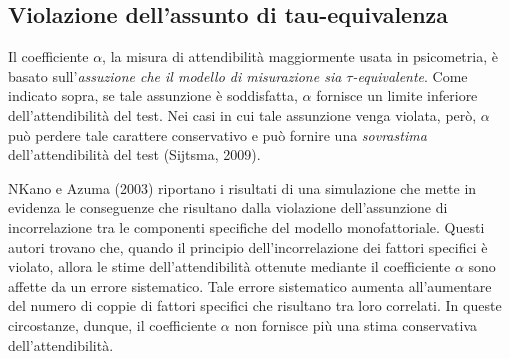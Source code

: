 \subsection{Violazione dell'assunto di tau-equivalenza}
\label{sec:violazione_tau}

Il coefficiente $\alpha$, la misura di attendibilità maggiormente
usata in psicometria, è basato sull'\textit{assuzione che il modello di
misurazione sia $\tau$-equivalente}.
Come indicato sopra, se tale assunzione è soddisfatta, $\alpha$ fornisce un limite inferiore dell'attendibilità del test.
Nei casi in cui tale assunzione venga violata, però,  $\alpha$ può perdere tale carattere conservativo e può fornire una \textit{sovrastima}  dell'attendibilità del test (Sijtsma, 2009).

NKano e Azuma (2003) riportano i risultati di una simulazione che mette in evidenza le conseguenze che risultano dalla violazione dell'assunzione di incorrelazione tra le componenti specifiche del modello monofattoriale.
% 
Questi autori trovano che, quando il principio dell'incorrelazione dei fattori specifici è violato, allora le stime dell'attendibilità ottenute mediante il coefficiente $\alpha$ sono affette da un errore sistematico.
Tale errore sistematico aumenta all'aumentare del numero di coppie di fattori specifici che risultano tra loro correlati. 
In queste circostanze, dunque, il coefficiente $\alpha$ non fornisce più una stima conservativa dell'attendibilità.

